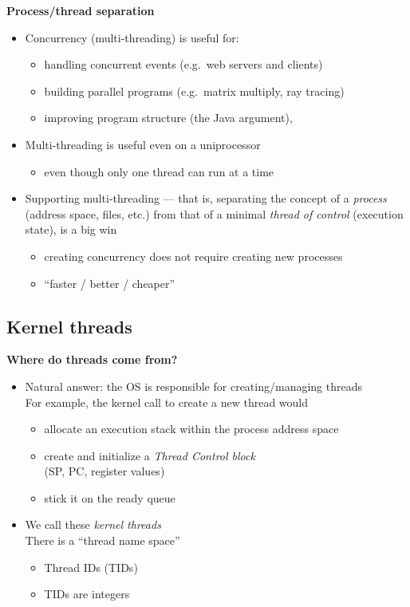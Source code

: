 \documentclass[11pt,a4paper]{article}
\begin{document}
\textbf{Process/thread separation}
\begin{itemize}
    \item Concurrency (multi-threading) is useful for:
        \begin{itemize}
            \item handling concurrent events (e.g.\ web servers and clients)
            \item building parallel programs (e.g.\ matrix multiply, ray tracing)
            \item improving program structure (the Java argument),
        \end{itemize}
    \item Multi-threading is useful even on a uniprocessor
        \begin{itemize}
            \item even though only one thread can run at a time
        \end{itemize}
    \item Supporting multi-threading --- that is, separating the concept of a \emph{process}
        (address space, files, etc.) from that of a minimal \emph{thread of control}
        (execution state), is a big win
        \begin{itemize}
            \item creating concurrency does not require creating new processes
            \item ``faster / better / cheaper''
        \end{itemize}
\end{itemize}

\subsection{Kernel threads}

\textbf{Where do threads come from?}
\begin{itemize}
    \item Natural answer: the OS is responsible for creating/managing threads \\
        For example, the kernel call to create a new thread would
        \begin{itemize}
            \item allocate an execution stack within the process address space
            \item create and initialize a \emph{Thread Control block} \\
                (SP, PC, register values)
            \item stick it on the ready queue
        \end{itemize}
    \item We call these \emph{kernel threads} \\
        There is a ``thread name space''
        \begin{itemize}
            \item Thread IDs (TIDs)
            \item TIDs are integers
        \end{itemize}
\end{itemize}
\end{document}
